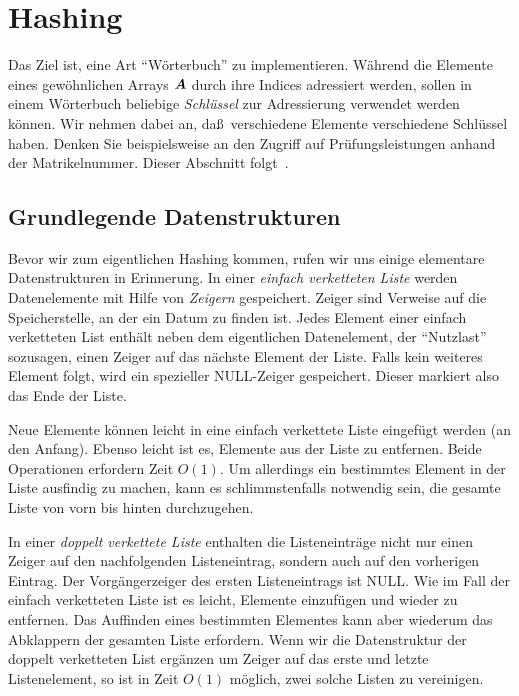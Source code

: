 \documentclass[10pt,reqno]{amsart}
\numberwithin{equation}{section}
\newcommand\vA{\vec A}
\def\vec#1{\mathchoice{\mbox{\boldmath$\displaystyle#1$}}
{\mbox{\boldmath$\textstyle#1$}}
{\mbox{\boldmath$\scriptstyle#1$}}
{\mbox{\boldmath$\scriptscriptstyle#1$}}}
\begin{document}
\section{Hashing}\label{sec_hash}

Das Ziel ist, eine Art ``W\"orterbuch'' zu implementieren.
W\"ahrend die Elemente eines gew\"ohnlichen Arrays $\vA$ durch ihre Indices adressiert werden, sollen in einem W\"orterbuch beliebige {\em Schl\"ussel} zur Adressierung verwendet werden k\"onnen.
Wir nehmen dabei an, da\ss\ verschiedene Elemente verschiedene Schl\"ussel haben.
Denken Sie beispielsweise an den Zugriff auf Pr\"ufungsleistungen anhand der Matrikelnummer.
Dieser Abschnitt folgt~\cite{Cormen}.

\subsection{Grundlegende Datenstrukturen}\label{sec_lists}
Bevor wir zum eigentlichen Hashing kommen, rufen wir uns einige elementare Datenstrukturen in Erinnerung.
In einer {\em einfach verketteten Liste} werden Datenelemente mit Hilfe von {\em Zeigern} gespeichert.
Zeiger sind Verweise auf die Speicherstelle, an der ein Datum zu finden ist.
Jedes Element einer einfach verketteten List enth\"alt neben dem eigentlichen Datenelement, der ``Nutzlast'' sozusagen, einen Zeiger auf das n\"achste Element der Liste.
Falls kein weiteres Element folgt, wird ein spezieller NULL-Zeiger gespeichert.
Dieser markiert also das Ende der Liste.

Neue Elemente k\"onnen leicht in eine einfach verkettete Liste eingef\"ugt werden (an den Anfang).
Ebenso leicht ist es, Elemente aus der Liste zu entfernen.
Beide Operationen erfordern Zeit $O(1)$.
Um allerdings ein bestimmtes Element in der Liste ausfindig zu machen, kann es schlimmstenfalls notwendig sein, die gesamte Liste von vorn bis hinten durchzugehen.

In einer {\em doppelt verkettete Liste} enthalten die Listeneintr\"age nicht nur einen Zeiger auf den nachfolgenden Listeneintrag, sondern auch auf den vorherigen Eintrag.
Der Vorg\"angerzeiger des ersten Listeneintrags ist NULL.
Wie im Fall der einfach verketteten Liste ist es leicht, Elemente einzuf\"ugen und wieder zu entfernen.
Das Auffinden eines bestimmten Elementes kann aber wiederum das Abklappern der gesamten Liste erfordern.
Wenn wir die Datenstruktur der doppelt verketteten List erg\"anzen um Zeiger auf das erste und letzte Listenelement, so ist in Zeit $O(1)$ m\"oglich, zwei solche Listen zu vereinigen.
\end{document}
